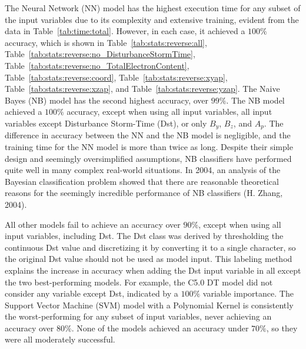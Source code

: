 \documentclass[sn-mathphys-num]{sn-jnl}%
\begin{document}
The Neural Network (NN) model has the highest execution time for any subset of the input variables due to its complexity and extensive training, evident from the data in Table~\ref{tab:time:total}. However, in each case, it achieved a $100\%$ accuracy, which is shown in Table~\ref{tab:stats:reverse:all}, Table~\ref{tab:stats:reverse:no_DisturbanceStormTime}, Table~\ref{tab:stats:reverse:no_TotalElectronContent}, Table~\ref{tab:stats:reverse:coord}, Table~\ref{tab:stats:reverse:xyap}, Table~\ref{tab:stats:reverse:xzap}, and Table~\ref{tab:stats:reverse:yzap}. The Naive Bayes (NB) model has the second highest accuracy, over $99\%$. The NB model achieved a $100\%$ accuracy, except when using all input variables, all input variables except Disturbance Storm-Time (Dst), or only $B_{y}$, $B_{z}$, and $A_{p}$. The difference in accuracy between the NN and the NB model is negligible, and the training time for the NN model is more than twice as long. Despite their simple design and seemingly oversimplified assumptions, NB classifiers have performed quite well in many complex real-world situations. In 2004, an analysis of the Bayesian classification problem showed that there are reasonable theoretical reasons for the seemingly incredible performance of NB classifiers (H. Zhang, 2004).

All other models fail to achieve an accuracy over $90\%$, except when using all input variables, including Dst. The Dst class was derived by thresholding the continuous Dst value and discretizing it by converting it to a single character, so the original Dst value should not be used as model input. This labeling method explains the increase in accuracy when adding the Dst input variable in all except the two best-performing models. For example, the C5.0 DT model did not consider any variable except Dst, indicated by a $100\%$ variable importance. The Support Vector Machine (SVM) model with a Polynomial Kernel is consistently the worst-performing for any subset of input variables, never achieving an accuracy over $80\%$. None of the models achieved an accuracy under $70\%$, so they were all moderately successful.
\end{document}
